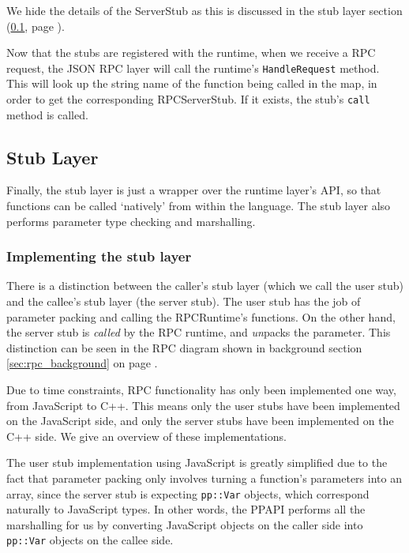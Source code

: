 We hide the details of the ServerStub as this is discussed in the stub layer section (\ref{sub:stub_layer_design}, page \pageref{sub:stub_layer_design}).

Now that the stubs are registered with the runtime, when we receive a RPC request, the JSON RPC layer will call the runtime's \lstinline{HandleRequest} method. This will look up the string name of the function being called in the map, in order to get the corresponding RPCServerStub. If it exists, the stub's \lstinline{call} method is called.



\subsection{Stub Layer} %
\label{sub:stub_layer_design}
Finally, the stub layer is just a wrapper over the runtime layer's API, so that functions can be called `natively' from within the language. The stub layer also performs parameter type checking and marshalling.

\subsubsection{Implementing the stub layer} %
\label{ssub:implementing_the_stub_layer}
There is a distinction between the caller's stub layer (which we call the user stub) and the callee's stub layer (the server stub). The user stub has the job of parameter packing and calling the RPCRuntime's functions. On the other hand, the server stub is \emph{called} by the RPC runtime, and \emph{un}packs the parameter. This distinction can be seen in the RPC diagram shown in background section \ref{sec:rpc_background} on page \pageref{sec:rpc_background}.

Due to time constraints, RPC functionality has only been implemented one way, from JavaScript to C++. This means only the user stubs have been implemented on the JavaScript side, and only the server stubs have been implemented on the C++ side. We give an overview of these implementations.

The user stub implementation using JavaScript is greatly simplified due to the fact that parameter packing only involves turning a function's parameters into an array, since the server stub is expecting \lstinline{pp::Var} objects, which correspond naturally to JavaScript types. In other words, the PPAPI performs all the marshalling for us by converting JavaScript objects on the caller side into \lstinline{pp::Var} objects on the callee side.

